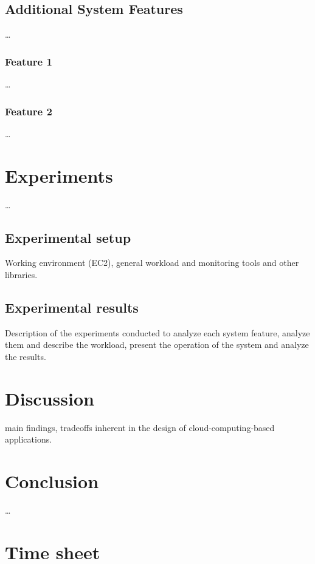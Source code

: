 \documentclass{stylesheet}
\begin{document}
\subsection{Additional System Features}
\label{subsec:additionalFeatures}
\ldots
\subsubsection{Feature 1}
\ldots
\subsubsection{Feature 2}
\ldots

\section{Experiments}
\label{sec:experiments}
\ldots
\subsection{Experimental setup}
\label{subsec:setup}
Working environment (EC2), general workload and monitoring tools and other libraries.

\subsection{Experimental results}
\label{subsec:results}
Description of the experiments conducted to analyze each system feature, analyze them and describe the workload, present the operation of the system and analyze the results.

\section{Discussion}
\label{sec:discussion}
main findings, tradeoffs inherent in the design of cloud-computing-based applications.

\section{Conclusion}
\label{sec:conclusion}
\ldots

\appendix
\section{Time sheet}
\label{app:time}



\end{document}
